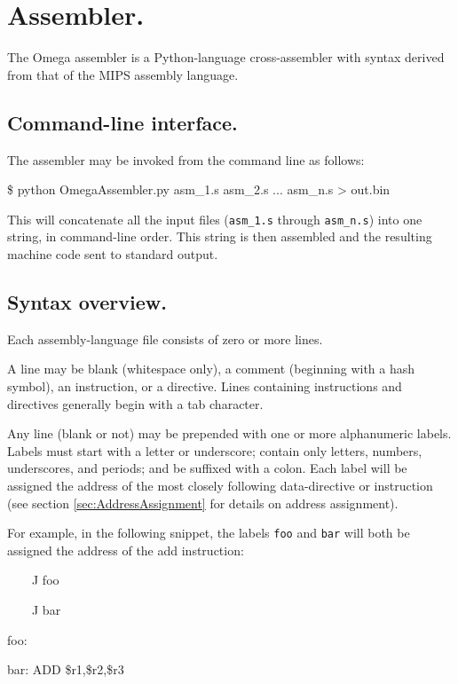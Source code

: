 \documentclass[12pt,english,twoside]{report}
\def\code{\texttt}
\newenvironment{codeblock}
{\begin{list}{}{
\setlength{\rightmargin}{\leftmargin}
\setlength{\listparindent}{0pt}%
\raggedright
\setlength{\itemsep}{0pt}
\setlength{\parsep}{0pt}
\normalfont\ttfamily}%
 \item[]}
{\end{list}}
\begin{document}
\chapter{\label{sec:Assembler} Assembler.}

The Omega assembler is a Python-language cross-assembler with syntax
derived from that of the MIPS assembly language.

\section{Command-line interface.}

The assembler may be invoked from the command line as follows:

\begin{codeblock}
  \$ python OmegaAssembler.py asm\_1.s asm\_2.s ... asm\_n.s > out.bin
\end{codeblock}

This will concatenate all the input files (\code{asm\_1.s} through
\code{asm\_n.s}) into one string, in command-line order. This string
is then assembled and the resulting machine code sent to standard
output.

\section{Syntax overview.}

Each assembly-language file consists of zero or more lines.

A line may be blank (whitespace only), a comment (beginning with a
hash symbol), an instruction, or a directive. Lines containing instructions
and directives generally begin with a tab character.

Any line (blank or not) may be prepended with one or more alphanumeric
labels. Labels must start with a letter or underscore; contain only
letters, numbers, underscores, and periods; and be suffixed with a
colon. Each label will be assigned the address of the most closely
following data-directive or instruction (see section
\ref{sec:AddressAssignment} for details on address assignment).

For example, in the following snippet, the labels \code{foo} and
\code{bar} will both be assigned the address of the add instruction:

\begin{codeblock}
  {}~~~~J foo
  
  {}~~~~J bar
  
  foo:

  bar: ADD \$r1,\$r2,\$r3
\end{codeblock}
\end{document}
